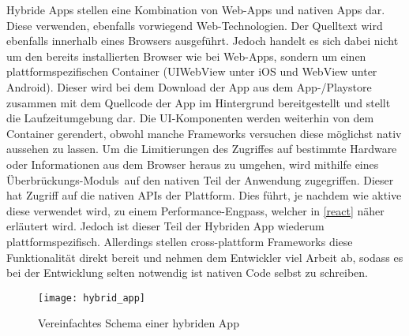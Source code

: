 Hybride Apps stellen eine Kombination von Web-Apps und nativen Apps dar. Diese verwenden, ebenfalls vorwiegend Web-Technologien. Der Quelltext  wird ebenfalls innerhalb eines Browsers ausgeführt. Jedoch handelt es sich dabei nicht um den bereits installierten Browser wie bei Web-Apps, sondern um einen plattformspezifischen Container (UIWebView unter iOS und WebView unter Android)\cite{xanthopoulos_compare_cross_plattform}. Dieser wird bei dem Download der App aus dem App-/Playstore zusammen mit dem Quellcode der App im Hintergrund bereitgestellt und stellt die Laufzeitumgebung dar. Die \ac{UI}-Komponenten werden weiterhin von dem Container gerendert, obwohl manche Frameworks versuchen diese möglichst nativ aussehen zu lassen. Um die Limitierungen des Zugriffes auf bestimmte Hardware oder Informationen aus dem Browser heraus zu umgehen, wird mithilfe eines \grqq Überbrückungs-Moduls\grqq\ auf den nativen Teil der Anwendung zugegriffen. Dieser hat Zugriff auf die nativen APIs der Plattform. Dies führt, je nachdem wie aktive diese verwendet wird, zu einem Performance-Engpass, welcher in \foreignlanguage{ngerman}{\cref{react}} näher erläutert wird. Jedoch ist dieser Teil der Hybriden App wiederum plattformspezifisch. Allerdings stellen cross-plattform Frameworks diese Funktionalität direkt bereit und nehmen dem Entwickler viel Arbeit ab, sodass es bei der Entwicklung selten notwendig ist nativen Code selbst zu schreiben\cite{kmu_fh_joanneum}.

\begin{figure}[!h]
	\texttt{[image: hybrid\_app]}
	\centering
	\caption{Vereinfachtes Schema einer hybriden App}
\end{figure}

